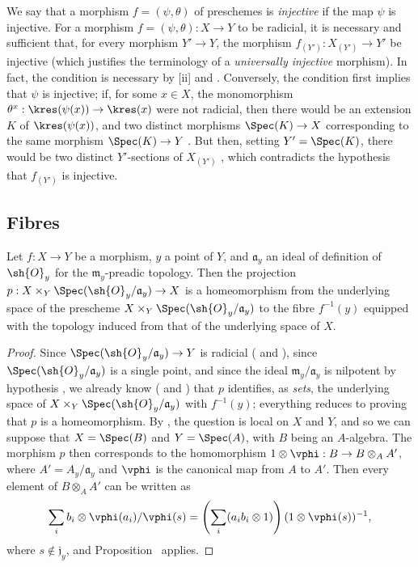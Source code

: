 \begin{remark}[3.5.11]
\label{I.3.5.11}
We say that a morphism $f=(\psi,\theta)$ of preschemes is \emph{injective} if the map $\psi$ is injective.
For a morphism $f=(\psi,\theta):X\to Y$ to be radicial, it is necessary and sufficient that, for every morphism $Y'\to Y$, the morphism $f_{(Y')}:X_{(Y')}\to Y'$ be injective (which justifies the terminology of a \emph{universally injective} morphism).
In fact, the condition is necessary by [ii] and .
Conversely, the condition first implies that $\psi$ is injective; if, for some $x\in X$, the monomorphism $\theta^x:\kres(\psi(x))\to\kres(x)$ were not radicial, then there would be an extension $K$ of $\kres(\psi(x))$, and two distinct morphisms $\Spec(K)\to X$ corresponding to the same morphism $\Spec(K)\to Y$ .
But then, setting $Y'=\Spec(K)$, there would be two distinct $Y'$-sections of $X_{(Y')}$ , which contradicts the hypothesis that $f_{(Y')}$ is injective.
\end{remark}

\subsection{Fibres}
\label{subsection:I.3.6}

\begin{proposition}[3.6.1]
\label{I.3.6.1}
Let $f:X\to Y$ be a morphism, $y$ a point of $Y$, and $\mathfrak{a}_y$ an ideal of definition of $\sh{O}_y$ for the $\mathfrak{m}_y$-preadic topology.
Then the projection $p:X\times_Y\Spec(\sh{O}_y/\mathfrak{a}_y)\to X$ is a homeomorphism from the underlying space of the prescheme $X\times_Y\Spec(\sh{O}_y/\mathfrak{a}_y)$ to the fibre $f^{-1}(y)$ equipped with the topology induced from that of the underlying space of $X$.
\end{proposition}

\begin{proof}
Since $\Spec(\sh{O}_y/\mathfrak{a}_y)\to Y$ is radicial ( and ), since $\Spec(\sh{O}_y/\mathfrak{a}_y)$ is a single point, and since the ideal $\mathfrak{m}_y/\mathfrak{a}_y$ is nilpotent by hypothesis , we already know ( and ) that $p$ identifies, as \emph{sets}, the underlying space of $X\times_Y\Spec(\sh{O}_y/\mathfrak{a}_y)$ with $f^{-1}(y)$; everything reduces to proving that $p$ is a homeomorphism.
By , the question is local on $X$ and $Y$, and so we can suppose that $X=\Spec(B)$ and $Y=\Spec(A)$, with $B$ being an $A$-algebra.
The morphism $p$ then corresponds to the homomorphism $1\otimes\vphi:B\to B\otimes_A A'$, where $A'=A_y/\mathfrak{a}_y$ and $\vphi$ is the canonical map from $A$ to $A'$.
Then every element of $B\otimes_A A'$ can be written as
\[
  \sum_i b_i\otimes\vphi(a_i)/\vphi(s)=\left(\sum_i(a_ib_i\otimes1)\right)(1\otimes\vphi(s))^{-1},
\]
where $s\not\in\mathfrak{j}_y$, and Proposition~ applies.
\end{proof}


